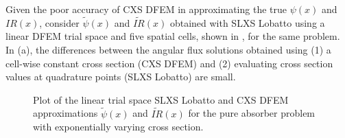 Given the poor accuracy of CXS DFEM in approximating the true $\psi(x)$ and $IR(x)$, consider $\widetilde{\psi}(x)$ and $\widetilde{IR}(x)$ obtained with SLXS Lobatto using a linear DFEM trial space and five spatial cells, shown in , for the same problem.  
In (a), the differences between the angular flux solutions obtained using (1) a cell-wise constant cross section (CXS DFEM) and (2) evaluating cross section values at quadrature points (SLXS Lobatto) are small.
\begin{figure}[!htp]
\begin{center}
\end{center}
\caption{Plot of the linear trial space SLXS Lobatto and CXS DFEM approximations $\widetilde{\psi}(x)$ and $\widetilde{IR}(x)$ for the pure absorber problem with exponentially varying cross section.}
\label{fig:lobatto_blades}
\end{figure}
